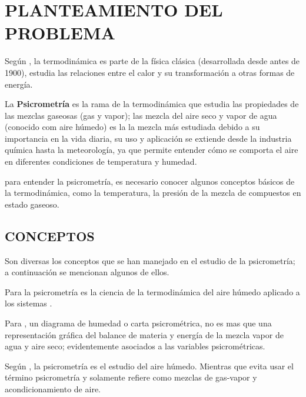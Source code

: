 \section{PLANTEAMIENTO DEL PROBLEMA}

    Según \parencite{bib:Serway2014}, la termodinámica es parte de la física clásica (desarrollada desde antes de 1900), estudia las relaciones entre el calor y su transformación a otras formas de energía.

    La \textbf{Psicrometría} es la rama de la termodinámica que estudia las propiedades de las mezclas gaseosas (gas y vapor); las mezcla del aire seco y vapor de agua (conocido com aire húmedo) es la la mezcla más estudiada debido a su importancia en la vida diaria, su uso y aplicación se extiende desde la industria química hasta la meteorología, ya que permite entender cómo se comporta el aire en diferentes condiciones de temperatura y humedad.

    para entender la psicrometría, es necesario conocer algunos conceptos básicos de la termodinámica, como la temperatura, la presión de la mezcla de compuestos en estado gaseoso.



    \subsection*{CONCEPTOS}
    Son diversas los conceptos que se han manejado en el estudio de la psicrometría; a continuación se mencionan algunos de ellos.

    Para \parencite[ p. 25]{bib:SamuelC.Sugarman2007} la psicrometría es la ciencia de la termodinámica del aire húmedo aplicado a los sistemas . 




    Para \textcite[]{bib:Himmelblau2004}, un diagrama de humedad o carta psicrométrica, no es mas que una representación gráfica del balance de materia y energía de la mezcla vapor de agua y aire seco; evidentemente asociados a las variables psicrométricas.


    Según \textcite[]{bib:Martinez1992}, la psicrometría es el estudio del aire húmedo. Mientras que \textcite[]{bib:cengel2015termodinamica} evita usar el término psicrometría y solamente refiere como mezclas de gas-vapor y acondicionamiento de aire.    




